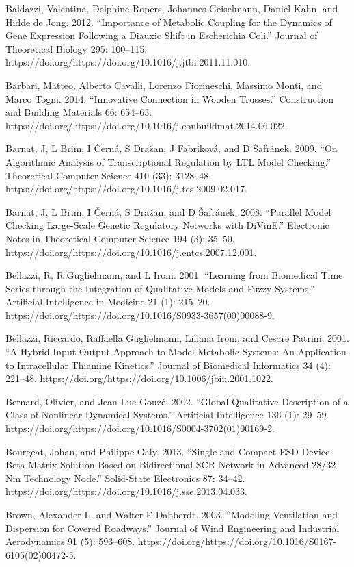 \documentclass[utf8]{gradu3}
\begin{document}
Baldazzi, Valentina, Delphine Ropers, Johannes Geiselmann, Daniel Kahn, and Hidde de Jong. 2012. “Importance of Metabolic Coupling for the Dynamics of Gene Expression Following a Diauxic Shift in Escherichia Coli.” Journal of Theoretical Biology 295: 100–115. https://doi.org/https://doi.org/10.1016/j.jtbi.2011.11.010.

Barbari, Matteo, Alberto Cavalli, Lorenzo Fiorineschi, Massimo Monti, and Marco Togni. 2014. “Innovative Connection in Wooden Trusses.” Construction and Building Materials 66: 654–63. https://doi.org/https://doi.org/10.1016/j.conbuildmat.2014.06.022.

Barnat, J, L Brim, I Černá, S Dražan, J Fabriková, and D Šafránek. 2009. “On Algorithmic Analysis of Transcriptional Regulation by LTL Model Checking.” Theoretical Computer Science 410 (33): 3128–48. https://doi.org/https://doi.org/10.1016/j.tcs.2009.02.017.

Barnat, J, L Brim, I Černá, S Dražan, and D Šafránek. 2008. “Parallel Model Checking Large-Scale Genetic Regulatory Networks with DiVinE.” Electronic Notes in Theoretical Computer Science 194 (3): 35–50. https://doi.org/https://doi.org/10.1016/j.entcs.2007.12.001.

Bellazzi, R, R Guglielmann, and L Ironi. 2001. “Learning from Biomedical Time Series through the Integration of Qualitative Models and Fuzzy Systems.” Artificial Intelligence in Medicine 21 (1): 215–20. https://doi.org/https://doi.org/10.1016/S0933-3657(00)00088-9.

Bellazzi, Riccardo, Raffaella Guglielmann, Liliana Ironi, and Cesare Patrini. 2001. “A Hybrid Input-Output Approach to Model Metabolic Systems: An Application to Intracellular Thiamine Kinetics.” Journal of Biomedical Informatics 34 (4): 221–48. https://doi.org/https://doi.org/10.1006/jbin.2001.1022.

Bernard, Olivier, and Jean-Luc Gouzé. 2002. “Global Qualitative Description of a Class of Nonlinear Dynamical Systems.” Artificial Intelligence 136 (1): 29–59. https://doi.org/https://doi.org/10.1016/S0004-3702(01)00169-2.

Bourgeat, Johan, and Philippe Galy. 2013. “Single and Compact ESD Device Beta-Matrix Solution Based on Bidirectional SCR Network in Advanced 28/32 Nm Technology Node.” Solid-State Electronics 87: 34–42. https://doi.org/https://doi.org/10.1016/j.sse.2013.04.033.

Brown, Alexander L, and Walter F Dabberdt. 2003. “Modeling Ventilation and Dispersion for Covered Roadways.” Journal of Wind Engineering and Industrial Aerodynamics 91 (5): 593–608. https://doi.org/https://doi.org/10.1016/S0167-6105(02)00472-5.
\end{document}
